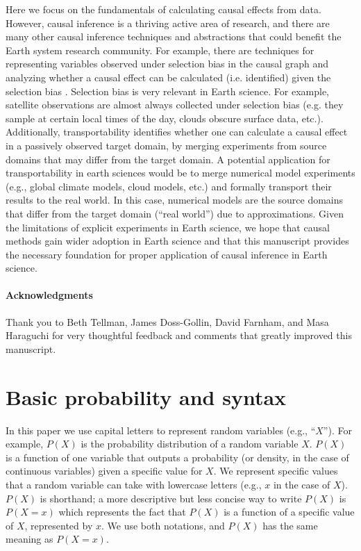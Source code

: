 \documentclass[12pt]{article}
\begin{document}
Here we focus on the fundamentals of calculating causal effects from
data. However, causal inference is a thriving active area of research,
and there are many other causal inference techniques and abstractions
that could benefit the Earth system research community. For example,
there are techniques for representing variables observed under
selection bias in the causal graph and analyzing whether a causal
effect can be calculated (i.e. identified) given the selection bias
\citep[e.g.,][]{bareinboim2014recovering}. Selection bias is very
relevant in Earth science. For example, satellite observations are
almost always collected under selection bias (e.g. they sample at
certain local times of the day, clouds obscure surface data,
etc.). Additionally, transportability
\citep[e.g.,][]{bareinboim2012transportability} identifies whether one
can calculate a causal effect in a passively observed target domain,
by merging experiments from source domains that may differ from the
target domain. A potential application for transportability in earth
sciences would be to merge numerical model experiments (e.g., global
climate models, cloud models, etc.) and formally transport their
results to the real world. In this case, numerical models are the
source domains that differ from the target domain (``real world'') due
to approximations. Given the limitations of explicit experiments in
Earth science, we hope that causal methods gain wider adoption in
Earth science and that this manuscript provides the necessary
foundation for proper application of causal inference in Earth
science.

\paragraph{Acknowledgments} Thank you to Beth Tellman, James
Doss-Gollin, David Farnham, and Masa Haraguchi for very thoughtful
feedback and comments that greatly improved this manuscript.




\appendix
\section{Basic probability and syntax}
\label{prob-theory}

In this paper we use capital letters to represent random variables
(e.g., ``$X$''). For example, $P(X)$ is the probability distribution
of a random variable $X$. $P(X)$ is a function of one variable that
outputs a probability (or density, in the case of continuous
variables) given a specific value for $X$. We represent specific
values that a random variable can take with lowercase letters (e.g.,
$x$ in the case of $X$). $P(X)$ is shorthand; a more descriptive but
less concise way to write $P(X)$ is $P(X=x)$ which represents the fact
that $P(X)$ is a function of a specific value of $X$, represented by
$x$. We use both notations, and $P(X)$ has the same meaning as
$P(X=x)$.
\end{document}
